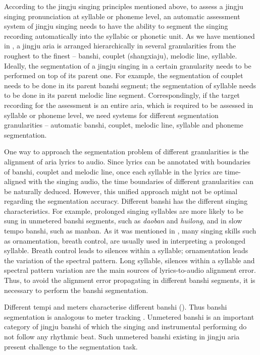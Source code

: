 According to the jingju singing principles mentioned above, to assess a jingju singing pronunciation at syllable or phoneme level, an automatic assessment system of jingju singing needs to have the ability to segment the singing recording automatically into the syllabic or phonetic unit. As we have mentioned in , a jingju aria is arranged hierarchically in several granularities from the roughest to the finest -- \gls{banshi}, couplet (shangxiaju), melodic line, syllable. Ideally, the segmentation of a jingju singing in a certain granularity needs to be performed on top of its parent one. For example, the segmentation of couplet needs to be done in its parent \gls{banshi} segment; the segmentation of syllable needs to be done in its parent melodic line segment. Correspondingly, if the target recording for the assessment is an entire aria, which is required to be assessed in syllable or phoneme level, we need systems for different segmentation granularities -- automatic \gls{banshi}, couplet, melodic line, syllable and phoneme segmentation. 

One way to approach the segmentation problem of different granularities is the alignment of aria lyrics to audio. Since lyrics can be annotated with boundaries of \gls{banshi}, couplet and melodic line, once each syllable in the lyrics are time-aligned with the singing audio, the time boundaries of different granularities can be naturally deduced. However, this unified approach might not be optimal regarding the segmentation accuracy. Different \gls{banshi} has the different singing characteristics. For example, prolonged singing syllables are more likely to be sung in unmetered \gls{banshi} segments, such as \textit{daoban} and \textit{huilong}, and in slow tempo \gls{banshi}, such as manban. As it was mentioned in , many singing skills such as ornamentation, breath control, are usually used in interpreting a prolonged syllable. Breath control leads to silences within a syllable; ornamentation leads the variation of the spectral pattern. Long syllable, silences within a syllable and spectral pattern variation are the main sources of lyrics-to-audio alignment error. Thus, to avoid the alignment error propagating in different \gls{banshi} segments, it is necessary to perform the \gls{banshi} segmentation.

Different tempi and meters characterise different \gls{banshi} (). Thus \gls{banshi} segmentation is analogous to meter tracking \cite{Srinivasamurthy2016}. Unmetered \gls{banshi} is an important category of jingju \gls{banshi} of which the singing and instrumental performing do not follow any rhythmic beat. Such unmetered \gls{banshi} existing in jingju aria present challenge to the segmentation task.

